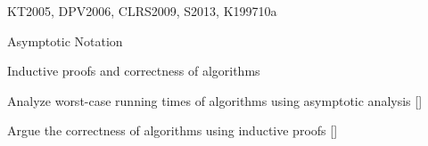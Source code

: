 \begin{syllabus}
\begin{unit}{\ALBasicAnalysis}{}{KT2005, DPV2006, CLRS2009, S2013, K1997}{10}{a}
\begin{topics}%
    \item \ALBasicAnalysisTopicDifferences %
    \item \ALBasicAnalysisTopicAsymptotic %
    \item \ALBasicAnalysisTopicComplexity %
    \item Asymptotic Notation
    \item \ALBasicAnalysisTopicAnalysis %
    \item Inductive proofs and correctness of algorithms
    \item \ALBasicAnalysisTopicSome %
\end{topics}
\begin{learningoutcomes}
    \item \ALBasicAnalysisLOExplain [\Assessment] %
    \item \ALBasicAnalysisLODetermine [\Assessment] %
    \item \ALBasicAnalysisLOList [\Assessment] %
    \item \ALBasicAnalysisLOExplainThe [\Assessment] %
    \item Analyze worst-case running times of algorithms using asymptotic analysis [\Assessment]
    \item \ALBasicAnalysisLOUseRecurrence [\Assessment] %
    \item \ALBasicAnalysisLOSolve [\Assessment] %
    \item Argue the correctness of algorithms using inductive proofs [\Assessment]
\end{learningoutcomes}
\end{unit}


\end{syllabus}
